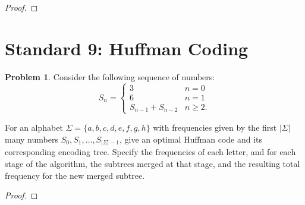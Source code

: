 \documentclass[11pt]{article}
\theoremstyle{definition}
\theoremstyle{definition}
\newtheorem{required}{Problem}
\theoremstyle{definition}
\begin{document}
\begin{proof}
\end{proof}


\newpage
\section{Standard 9: Huffman Coding}
\begin{required}
Consider the following sequence of numbers:
\[
S_n = \begin{cases}
3 & n = 0 \\
6 & n = 1 \\
S_{n-1} + S_{n-2} & n \geq 2.
\end{cases}
\]

For an alphabet $\Sigma = \{a,b,c,d,e,f,g,h\}$ with frequencies given by the first $|\Sigma|$ many numbers $S_0, S_1, \dotsc, S_{|\Sigma|-1}$, give an optimal Huffman code and its corresponding encoding tree. Specify the frequencies of each letter, and for each stage of the algorithm, the subtrees merged at that stage, and the resulting total frequency for the new merged subtree.
\end{required}

\begin{proof}
\end{proof}



\end{document}
